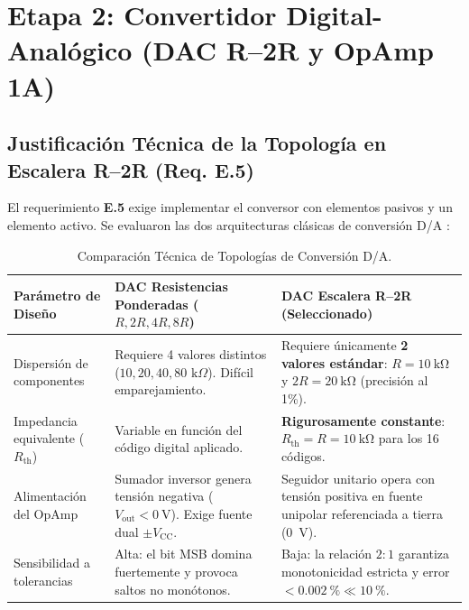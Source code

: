 \documentclass[11pt,letterpaper]{article}
\begin{document}
\section{Etapa 2: Convertidor Digital-Analógico (DAC R--2R y OpAmp 1A)}

\subsection{Justificación Técnica de la Topología en Escalera R--2R (Req. E.5)}
El requerimiento \textbf{E.5} exige implementar el conversor con elementos pasivos y un elemento activo. Se evaluaron las dos arquitecturas clásicas de conversión D/A \cite{franco2015,sedra2020}:

\begin{table}[htbp]
\centering
\caption{Comparación Técnica de Topologías de Conversión D/A.}
\label{tab:comparacion_dac}
\small
\renewcommand{\arraystretch}{1.2}
\begin{tabular}{p{4.5cm}p{5.5cm}p{5.5cm}}
\toprule
\textbf{Parámetro de Diseño} & \textbf{DAC Resistencias Ponderadas ($R, 2R, 4R, 8R$)} & \textbf{DAC Escalera R--2R (Seleccionado)} \\
\midrule
Dispersión de componentes & Requiere 4 valores distintos ($10, 20, 40, 80\text{ k}\Omega$). Difícil emparejamiento. & Requiere únicamente \textbf{2 valores estándar}: $R=\SI{10}{\kilo\ohm}$ y $2R=\SI{20}{\kilo\ohm}$ (precisión al 1\%). \\
Impedancia equivalente ($R_{\text{th}}$) & Variable en función del código digital aplicado. & \textbf{Rigurosamente constante}: $R_{\text{th}} = R = \SI{10}{\kilo\ohm}$ para los 16 códigos. \\
Alimentación del OpAmp & Sumador inversor genera tensión negativa ($V_{\text{out}} < \SI{0}{\volt}$). Exige fuente dual $\pm V_{\text{CC}}$. & Seguidor unitario opera con tensión positiva en fuente unipolar referenciada a tierra (\SI{0}{\volt}). \\
Sensibilidad a tolerancias & Alta: el bit MSB domina fuertemente y provoca saltos no monótonos. & Baja: la relación $2:1$ garantiza monotonicidad estricta y error $< \SI{0.002}{\percent} \ll \SI{10}{\percent}$. \\
\bottomrule
\end{tabular}
\end{table}
\end{document}
